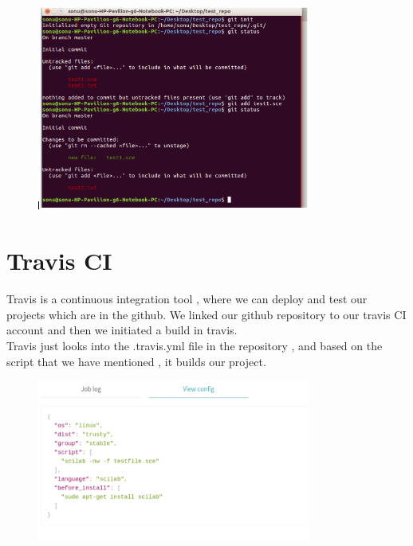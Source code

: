 \documentclass[12pt,a4paper]{report}
\begin{document}
\begin{figure}[H]
\centering
\includegraphics[width = 0.8\textwidth]{git.png}
\end{figure}

\newpage

\section{Travis CI}

Travis is a continuous integration tool , where we can deploy and test our projects which are in the github. We linked our github repository to our travis CI account and then we initiated a build in travis.\\
Travis just looks into the .travis.yml file in the repository , and based on the script that we have mentioned , it builds our project.\\

\begin{figure}[H]
\centering
\includegraphics[width = 0.8\textwidth]{travisconfig.png}
\end{figure}
\end{document}
